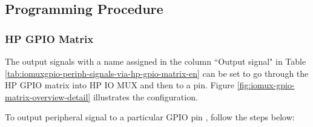 \documentclass[main\_\_EN.tex]{subfiles}
\begin{document}
\subsection{Programming Procedure}

\subsubsection{HP GPIO Matrix}
\label{sec:programming-procedure-hp-gpio-matrix-output}

The output signals with a name assigned in the column ``Output signal" in Table \ref{tab:iomuxgpio-periph-signals-via-hp-gpio-matrix-en} can be set to go through the HP GPIO matrix into HP IO MUX and then to a pin. Figure \ref{fig:iomux-gpio-matrix-overview-detail} illustrates the configuration.

To output peripheral signal  to a particular GPIO pin , follow the steps below:
\end{document}
